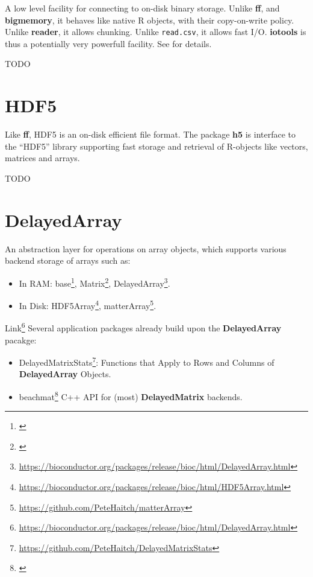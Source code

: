\documentclass[]{book}
\providecommand{\tightlist}{%
  \setlength{\itemsep}{0pt}\setlength{\parskip}{0pt}}
\renewcommand{\href}[2]{#2\footnote{\url{#1}}}
\theoremstyle{definition}
\theoremstyle{definition}
\theoremstyle{definition}
\theoremstyle{remark}
\begin{document}
A low level facility for connecting to on-disk binary storage.
Unlike \textbf{ff}, and \textbf{bigmemory}, it behaves like native R objects, with their copy-on-write policy.
Unlike \textbf{reader}, it allows chunking.
Unlike \texttt{read.csv}, it allows fast I/O.
\textbf{iotools} is thus a potentially very powerfull facility.
See \citet{arnold2015iotools} for details.

TODO

\hypertarget{hdf5}{%
\section{HDF5}\label{hdf5}}

Like \textbf{ff}, HDF5 is an on-disk efficient file format.
The package \textbf{h5} is interface to the ``HDF5'' library supporting fast storage and retrieval of R-objects like vectors, matrices and arrays.

TODO

\hypertarget{delayedarray}{%
\section{DelayedArray}\label{delayedarray}}

An abstraction layer for operations on array objects, which supports various backend storage of arrays such as:

\begin{itemize}
\tightlist
\item
  In RAM: \href{}{base}, \href{}{Matrix}, \href{https://bioconductor.org/packages/release/bioc/html/DelayedArray.html}{DelayedArray}.
\item
  In Disk: \href{https://bioconductor.org/packages/release/bioc/html/HDF5Array.html}{HDF5Array}, \href{https://github.com/PeteHaitch/matterArray}{matterArray}.
\end{itemize}

\href{https://bioconductor.org/packages/release/bioc/html/DelayedArray.html}{Link}
Several application packages already build upon the \textbf{DelayedArray} pacakge:

\begin{itemize}
\tightlist
\item
  \href{https://github.com/PeteHaitch/DelayedMatrixStats}{DelayedMatrixStats}: Functions that Apply to Rows and Columns of \textbf{DelayedArray} Objects.
\item
  \href{}{beachmat} C++ API for (most) \textbf{DelayedMatrix} backends.
\end{itemize}
\end{document}
